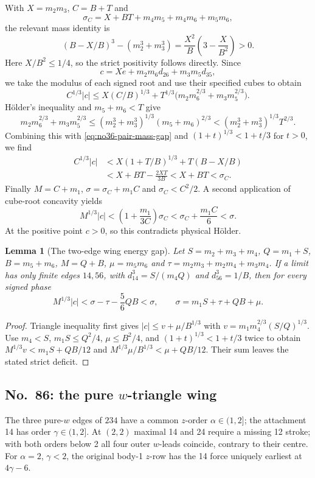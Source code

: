 \documentclass[11pt]{amsart}
\newtheorem{lemma}[theorem]{Lemma}
\theoremstyle{remark}
\begin{document}
With $X=m_2m_3$, $C=B+T$ and
\[
 \sigma_C=X+BT+m_4m_5+m_4m_6+m_5m_6,
\]
the relevant mass identity is
\begin{equation}\label{eq:no36-pair-mass-gap}
 (B-X/B)^3-(m_2^3+m_3^3)
 =\frac{X^2}{B}\left(3-\frac{X}{B^2}\right)>0.
\end{equation}
Here $X/B^2\le1/4$, so the strict positivity follows directly. Since
\[
 c=Xe+m_2m_6d_{26}+m_3m_5d_{35},
\]
we take the modulus of each signed root and use their specified cubes to obtain
\[
 C^{1/3}|c|
 \le X(C/B)^{1/3}
    +T^{1/3}\bigl(m_2m_6^{2/3}+m_3m_5^{2/3}\bigr).
\]
H\"older's inequality and $m_5+m_6<T$ give
\[
 m_2m_6^{2/3}+m_3m_5^{2/3}
 \le(m_2^3+m_3^3)^{1/3}(m_5+m_6)^{2/3}
 <(m_2^3+m_3^3)^{1/3}T^{2/3}.
\]
Combining this with \eqref{eq:no36-pair-mass-gap} and $(1+t)^{1/3}<1+t/3$ for $t>0$, we find
\[
\begin{aligned}
 C^{1/3}|c|
 &<X(1+T/B)^{1/3}+T(B-X/B)\\
 &<X+BT-\frac{2XT}{3B}<X+BT<\sigma_C.
\end{aligned}
\]
Finally $M=C+m_1$, $\sigma=\sigma_C+m_1C$ and $\sigma_C<C^2/2$. A second application of cube-root concavity yields
\[
 M^{1/3}|c|
 <\left(1+\frac{m_1}{3C}\right)\sigma_C
 <\sigma_C+\frac{m_1C}{6}<\sigma.
\]
At the positive point $c>0$, so this contradicts physical H\"older.
\begin{lemma}[The two-edge wing energy gap]\label{lem:excluded-two-edge-gap}
Let $S=m_2+m_3+m_4$, $Q=m_1+S$, $B=m_5+m_6$, $M=Q+B$, $\mu=m_5m_6$ and $\tau=m_2m_3+m_2m_4+m_3m_4$. If a limit has only finite edges $14,56$, with $d_{14}^3=S/(m_4Q)$ and $d_{56}^3=1/B$, then for every signed phase
\begin{equation}\label{eq:two-edge-wing-gap}
M^{1/3}|c|<\sigma-\tau-\frac56QB<\sigma,\qquad \sigma=m_1S+\tau+QB+\mu.
\end{equation}
\end{lemma}
\begin{proof}
Triangle inequality first gives $|c|\le v+\mu/B^{1/3}$ with $v=m_1m_4^{2/3}(S/Q)^{1/3}$. Use $m_4<S$, $m_1S\le Q^2/4$, $\mu\le B^2/4$, and $(1+t)^{1/3}<1+t/3$ twice to obtain $M^{1/3}v<m_1S+QB/12$ and $M^{1/3}\mu/B^{1/3}<\mu+QB/12$. Their sum leaves the stated strict deficit.
\end{proof}

\subsection{No.~86: the pure $w$-triangle wing}\label{sec:no86-wing}
The three pure-$w$ edges of $234$ have a common $z$-order $\alpha\in(1,2]$; the attachment 14 has order $\gamma\in(1,2]$. At $(2,2)$ maximal 14 and 24 require a missing 12 stroke; with both orders below 2 all four outer $w$-leads coincide, contrary to their centre. For $\alpha=2$, $\gamma<2$, the original body-1 $z$-row has the 14 force uniquely earliest at $4\gamma-6$.
\end{document}
